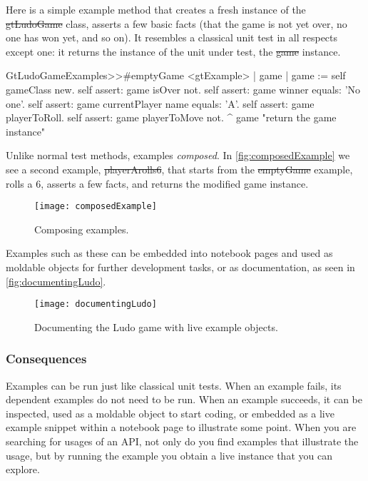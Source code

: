 \documentclass[sigconf]{acmart}
\renewcommand{\nbc}[3]{} %
\newcommand\eog[1]{\nbc{Edward}{#1}{purple}}
\begin{document}
Here is a simple example method that creates a fresh instance of the \st{gtLudoGame} class, asserts a few basic facts (\ie that the game is not yet over, no one has won yet, and so on).
It resembles a classical unit test in all respects except one: it returns the instance of the unit under test, \ie the \st{game} instance.

\begin{code}
GtLudoGameExamples>>#emptyGame
	<gtExample>
	| game |
	game := self gameClass new.
	self assert: game isOver not.
	self assert: game winner equals: 'No one'.
	self assert: game currentPlayer name equals: 'A'.
	self assert: game playerToRoll.
	self assert: game playerToMove not.
	^ game  "return the game instance"
\end{code}

Unlike normal test methods, examples  \emph{composed}.
In \autoref{fig:composedExample} we see a second example, \st{playerArolls6}, that starts from the \st{emptyGame} example, rolls a $6$, asserts a few facts, and returns the modified game instance.


\begin{figure}[h]
  \texttt{[image: composedExample]}
  \caption{Composing examples.}
  \label{fig:composedExample}
\end{figure}

Examples such as these can be embedded into notebook pages and used as moldable objects for further development tasks, or as documentation, as seen in \autoref{fig:documentingLudo}.

\begin{figure}[h]
  \texttt{[image: documentingLudo]}
  \caption{Documenting the Ludo game with live example objects.}
  \label{fig:documentingLudo}
\end{figure}

    
\subsubsection*{Consequences}
Examples can be run just like classical unit tests.
When an example fails, its dependent examples do not need to be run.
When an example succeeds, it can be inspected, used as a moldable object to start coding, or embedded as a live example snippet within a notebook page to illustrate some point.
When you are searching for usages of an API, not only do you find examples that illustrate the usage, but by running the example you obtain a live instance that you can explore.
\end{document}
